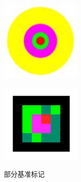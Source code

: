 \begin{figure}[htb]
\begin{minipage}[t]{0.33\linewidth}
		\label{fig:2-8f} 
	\end{minipage}
	\begin{minipage}[t]{0.33\linewidth} 
		\centering
		\includegraphics[width=\columnwidth]{figures/2-8g.png} 
		\label{fig:2-8g} 
	\end{minipage}
	\begin{minipage}[t]{0.33\linewidth} 
		\centering
		\includegraphics[width=\columnwidth]{figures/2-8h.png} 
		\label{fig:2-8h} 
	\end{minipage}
	\caption{部分基准标记}
	\label{fig:2-8}
\end{figure}

